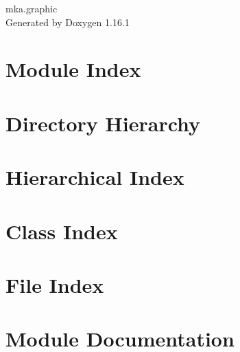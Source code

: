 \documentclass[twoside]{book}
\newcommand{\+}{\discretionary{\mbox{\scriptsize$\hookleftarrow$}}{}{}}
\newcommand{\clearemptydoublepage}{%
    \newpage{\pagestyle{empty}\cleardoublepage}%
  }
\begin{document}
  \raggedbottom
    \hypersetup{pageanchor=false,
                bookmarksnumbered=true,
                pdfencoding=unicode
               }
  \begin{titlepage}
  \vspace*{7cm}
  \begin{center}%
  {\Large mka.\+graphic}\\
  \vspace*{1cm}
  {\large Generated by Doxygen 1.16.1}\\
  \end{center}
  \end{titlepage}
  \clearemptydoublepage
  \tableofcontents
  \clearemptydoublepage
  \hypersetup{pageanchor=true}







\chapter{Module Index}

\chapter{Directory Hierarchy}

\chapter{Hierarchical Index}

\chapter{Class Index}

\chapter{File Index}

\chapter{Module Documentation}


















\end{document}
